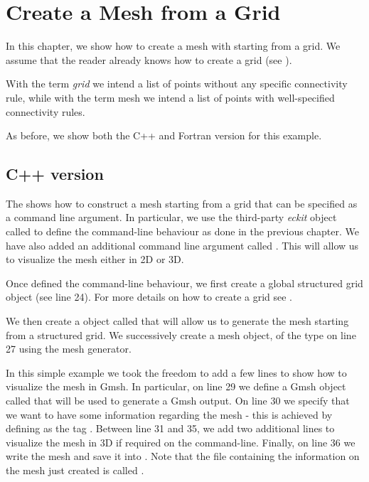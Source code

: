 \chapter{Create a Mesh from a Grid}
In this chapter, we show how to create a mesh with \Atlas 
starting from a grid. We assume that the reader already 
knows how to create a grid (see ). 
% 
\begin{notebox}
With the term \textit{grid} we intend a list of points 
without any specific connectivity rule, while with the 
term mesh we intend a list of points with well-specified 
connectivity rules.
\end{notebox}
%
As before, we show both the C++ and Fortran version 
for this example.


\section{C++ version}
The  shows how to construct a mesh 
starting from a grid that can be specified as a command 
line argument. In particular, we use the third-party 
\textit{eckit} object called  to define 
the command-line behaviour as done in the previous chapter. 
We have also added an additional command line argument 
called . This will allow us to 
visualize the mesh either in 2D or 3D. 
%

%
Once defined the command-line behaviour, we first create 
a global structured grid object (see line 24). For more 
details on how to create a grid see .

We then create a 
 object called 
that will allow us to generate the mesh starting from
a structured grid.
We successively create a mesh object,  
of the  type on line 27 using the mesh generator.

In this simple example we took the freedom to add a few 
lines to show how to visualize the mesh in Gmsh. In particular, 
on line 29 we define a Gmsh object called  that 
will be used to generate a Gmsh output. On line 30 we specify 
that we want to have some information regarding the mesh - this 
is achieved by defining as  the tag .
Between line 31 and 35, we add two additional lines to visualize 
the mesh in 3D if required on the command-line.
Finally, on line 36 we write the mesh and save it into .
Note that the file containing the information on the mesh 
just created is called .

